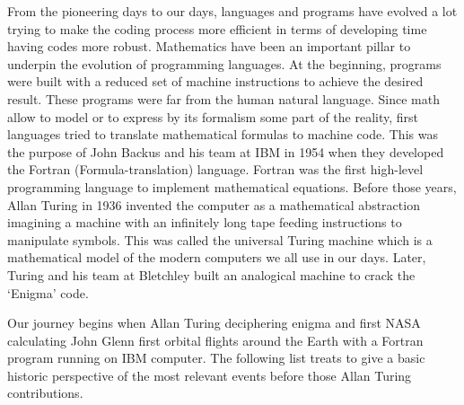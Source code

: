  From the pioneering days to our days, languages and programs have evolved 
 a lot trying to make the coding process more efficient in terms of developing time 
 having codes more robust. Mathematics have been an important pillar to underpin
 the evolution of programming  languages. 
 At the beginning, programs were built with a reduced set of machine instructions 
 to achieve the desired result. These programs were far from the human natural language.
 Since math allow to model or to express by its formalism some part of the reality, first 
 languages tried to translate mathematical formulas to machine code. This was the purpose 
 of John Backus and his team at IBM in 1954 when they developed 
 the Fortran (Formula-translation) language. 
 Fortran was the first high-level programming language to implement mathematical equations. 
 Before those years, Allan Turing in 1936 invented the computer as a mathematical  abstraction 
 imagining a machine with an infinitely long tape feeding instructions to manipulate symbols. 
 This was called the universal Turing machine 
 which is a mathematical model of the modern computers we all use in our days. 
 Later, Turing and his team at Bletchley built an analogical machine 
 to crack the ‘Enigma’ code. 
  
  
 
 Our journey begins when Allan Turing deciphering enigma and first NASA calculating 
 John Glenn first orbital flights around the Earth with a Fortran program running on IBM computer. 
 The following list treats to give a basic historic perspective
 of the most relevant events before those Allan Turing contributions. 
 
